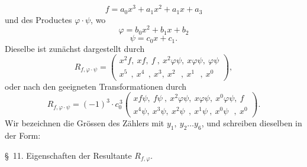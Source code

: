 \documentclass[11pt]{article}
\providecommand{\weberpage}[1]{}
\begin{document}
\[
f = a_0x^3 + a_1x^2 + a_1x + a_3 %
\]
und des Productes $\varphi\cdot\psi$, wo
\[
\varphi = b_0x^2+b_1x+b_2
\]
\[
\psi = c_0x+c_1.
\]
Dieselbe ist zun\"achst dargestellt durch
\[
R_{f,\varphi\cdot\psi} =
\begin{pmatrix}
x^2f,\ xf,\ f\ ,\ x^2\varphi\psi,\ x\varphi\psi,\ \varphi\psi\\
x^5\ \ ,\ x^4\ \ ,\ x^3,\ x^2\ \ \ ,\ x^1\ \ \ ,\ x^0
\end{pmatrix},
\]
oder nach den geeigneten Transformationen durch
\[
R_{f,\varphi\cdot\psi} = (-1)^3\cdot c_0^{\,3}
\begin{pmatrix}
xf\psi,\ f\psi\ ,\ x^2\varphi\psi,\ x\varphi\psi,\ x^0\varphi\psi,\ f\\
x^4\psi,\ x^3\psi,\ x^2\psi\ \ ,\ x^1\psi\ ,\ x^0\psi\ \ \ ,\ x^0
\end{pmatrix}.
\]
Wir bezeichnen die Gr\"ossen des Z\"ahlers mit $y_1,\ y_2\ldots y_6$, und schreiben dieselben in der Form:


\weberpage{165}
\S\ 11. Eigenschaften der Resultante $R_{f,\varphi}$.
\end{document}
